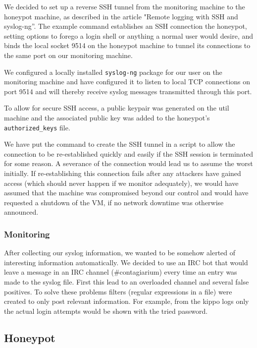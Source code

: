 \documentclass[11pt]{article}
\begin{document}
We decided to set up a reverse SSH tunnel from the monitoring machine to the honeypot machine, as described in the article "Remote logging with SSH and syslog-ng''. \cite{remote_logging}
The example command establishes an SSH connection the honeypot, setting options to forego a login shell or anything a normal user would desire, and binds the local socket 9514 on the honeypot machine to tunnel its connections to the same port on our monitoring machine.

We configured a locally installed \verb|syslog-ng| package for our user on the monitoring machine and have configured it to listen to local TCP connections on port 9514 and will thereby receive syslog messages transmitted through this port.

To allow for secure SSH access, a public keypair was generated on the util machine and the associated public key was added to the honeypot's \verb|authorized_keys| file.

We have put the command to create the SSH tunnel in a script to allow the connection to be re-established quickly and easily if the SSH session is terminated for some reason. 
A severance of the connection would lead us to assume the worst initially.
If re-establishing this connection fails after any attackers have gained access (which should never happen if we monitor adequately), we would have assumed that the machine was compromised beyond our control and would have requested a shutdown of the VM, if no network downtime was otherwise announced.

\subsubsection{Monitoring}
After collecting our syslog information, we wanted to be somehow alerted of interesting information automatically.
We decided to use an IRC bot that would leave a message in an IRC channel (\#contagiarium) every time an entry was made to the syslog file. First this lead to an overloaded channel and several false positives. To solve these problems filters (regular expressions in a file) were created to only post relevant information. For example, from the kippo logs only the actual login attempts would be shown with the tried password.


\subsection{Honeypot}
\end{document}
